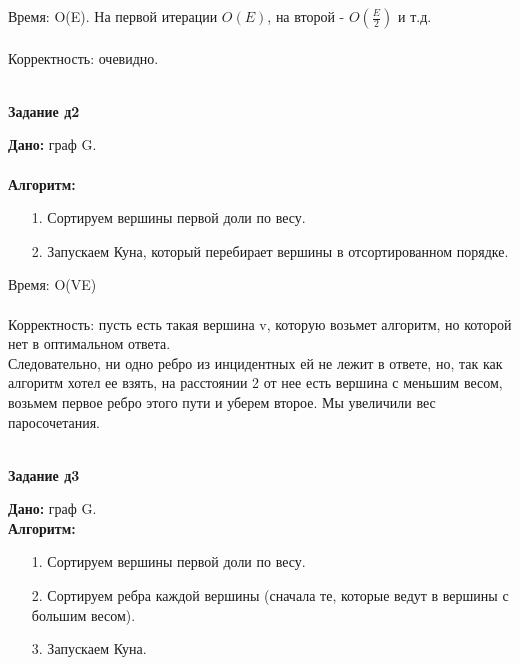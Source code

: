 \documentclass[12pt]{article} %
\begin{document}
	Время: O(E). На первой итерации $O(E)$, на второй - $O(\frac{E}{2})$ и т.д.\\
	\\
	Корректность: очевидно.\\
	\\
	\begin{center}
		\textbf{Задание д2}\\
	\end{center}
	\textbf{Дано:} граф G.\\
	\\
	\textbf{Алгоритм:}\\
	\begin{enumerate}
		\item[1.] Сортируем вершины первой доли по весу.
		\item[2.] Запускаем Куна, который перебирает вершины в отсортированном порядке.
	\end{enumerate}
	Время: O(VE)\\
	\\
	Корректность: пусть есть такая вершина v, которую возьмет алгоритм, но которой нет в оптимальном ответа.\\
				  Следовательно, ни одно ребро из инцидентных ей не лежит в ответе, но, так как алгоритм хотел ее взять,
				  на расстоянии 2 от нее есть вершина с меньшим весом, возьмем первое ребро этого пути и уберем второе.
				  Мы увеличили вес паросочетания.\\
	\\
	\begin{center}
		\textbf{Задание д3}\\
	\end{center}
	\textbf{Дано:} граф G.\\
	\textbf{Алгоритм:}\\
	\begin{enumerate}
		\item[1.] Сортируем вершины первой доли по весу.
		\item[2.] Сортируем ребра каждой вершины (сначала те, которые ведут в вершины с большим весом).
		\item[3.] Запускаем Куна.
	\end{enumerate}
\end{document}
